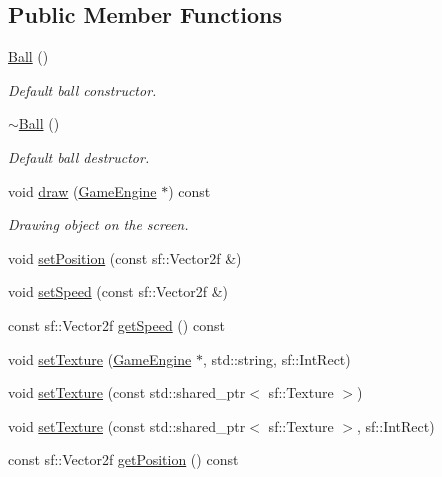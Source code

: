 \subsection*{Public Member Functions}
\begin{DoxyCompactItemize}
\item 
\mbox{\hyperlink{class_ball_a86a144d3dad6c953e422e32435923bbb}{Ball}} ()
\begin{DoxyCompactList}\small\item\em Default ball constructor. \end{DoxyCompactList}\item 
\mbox{\hyperlink{class_ball_a20f2f6ac0bf648f406a8e12e63429fcd}{$\sim$\+Ball}} ()
\begin{DoxyCompactList}\small\item\em Default ball destructor. \end{DoxyCompactList}\item 
void \mbox{\hyperlink{class_ball_a278c50c66e8ea81f2178328022d742ff}{draw}} (\mbox{\hyperlink{class_game_engine}{Game\+Engine}} $\ast$) const
\begin{DoxyCompactList}\small\item\em Drawing object on the screen. \end{DoxyCompactList}\item 
void \mbox{\hyperlink{class_ball_af2260b5f0b9b20d4974ada97481004f3}{set\+Position}} (const sf\+::\+Vector2f \&)
\item 
void \mbox{\hyperlink{class_ball_ad82f5f35eaf987d5c2b0faabd06989c5}{set\+Speed}} (const sf\+::\+Vector2f \&)
\item 
const sf\+::\+Vector2f \mbox{\hyperlink{class_ball_a9986943aa6685d80f65d441dd68c2e69}{get\+Speed}} () const
\item 
void \mbox{\hyperlink{class_ball_a9ac324bd0e233a1baf7ccb9eee5d05ca}{set\+Texture}} (\mbox{\hyperlink{class_game_engine}{Game\+Engine}} $\ast$, std\+::string, sf\+::\+Int\+Rect)
\item 
void \mbox{\hyperlink{class_ball_a4f750fa26a759145e3b04bba05d87711}{set\+Texture}} (const std\+::shared\+\_\+ptr$<$ sf\+::\+Texture $>$)
\item 
void \mbox{\hyperlink{class_ball_af15cbcd2773587b98db326fbc994b7a2}{set\+Texture}} (const std\+::shared\+\_\+ptr$<$ sf\+::\+Texture $>$, sf\+::\+Int\+Rect)
\item 
const sf\+::\+Vector2f \mbox{\hyperlink{class_ball_a672da3b511f6b30fde82a63927fe8174}{get\+Position}} () const
\item 

\end{DoxyCompactItemize}
